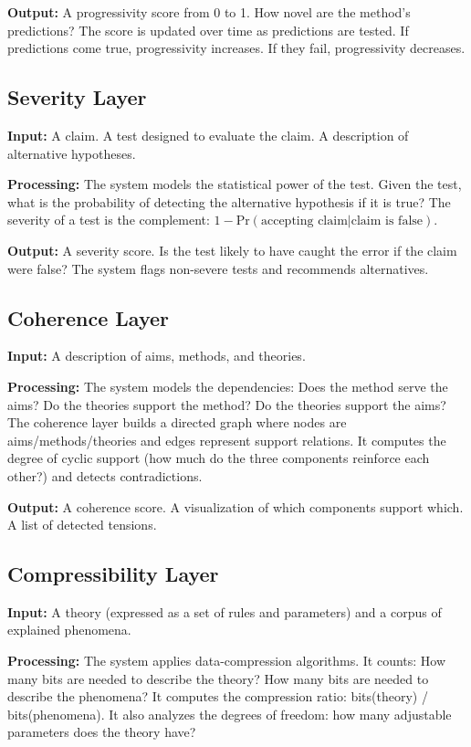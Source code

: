 \documentclass[11pt,letterpaper]{article}
\begin{document}
\textbf{Output:} A progressivity score from 0 to 1. How novel are the method's predictions? The score is updated over time as predictions are tested. If predictions come true, progressivity increases. If they fail, progressivity decreases.

\subsection*{Severity Layer}

\textbf{Input:} A claim. A test designed to evaluate the claim. A description of alternative hypotheses.

\textbf{Processing:} The system models the statistical power of the test. Given the test, what is the probability of detecting the alternative hypothesis if it is true? The severity of a test is the complement: $1 - \text{Pr}(\text{accepting claim} | \text{claim is false})$.

\textbf{Output:} A severity score. Is the test likely to have caught the error if the claim were false? The system flags non-severe tests and recommends alternatives.

\subsection*{Coherence Layer}

\textbf{Input:} A description of aims, methods, and theories.

\textbf{Processing:} The system models the dependencies: Does the method serve the aims? Do the theories support the method? Do the theories support the aims? The coherence layer builds a directed graph where nodes are aims/methods/theories and edges represent support relations. It computes the degree of cyclic support (how much do the three components reinforce each other?) and detects contradictions.

\textbf{Output:} A coherence score. A visualization of which components support which. A list of detected tensions.

\subsection*{Compressibility Layer}

\textbf{Input:} A theory (expressed as a set of rules and parameters) and a corpus of explained phenomena.

\textbf{Processing:} The system applies data-compression algorithms. It counts: How many bits are needed to describe the theory? How many bits are needed to describe the phenomena? It computes the compression ratio: bits(theory) / bits(phenomena). It also analyzes the degrees of freedom: how many adjustable parameters does the theory have?
\end{document}
